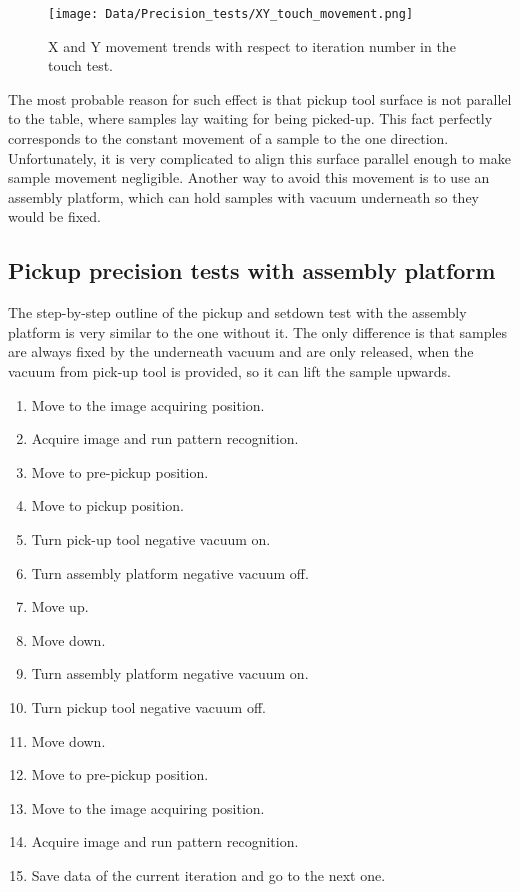 \begin{figure}[ht]\centering
\texttt{[image: Data/Precision\_tests/XY\_touch\_movement.png]}
\caption{X and Y movement trends with respect to iteration number in the touch test.}
\label{fig:touch_move}
\end{figure}

The most probable reason for such effect is that pickup tool surface is not parallel to the table, where samples lay waiting for being picked-up. This fact perfectly corresponds to the constant movement of a sample to the one direction. Unfortunately, it is very complicated to align this surface parallel enough to make sample movement negligible. Another way to avoid this movement is to use an assembly platform, which can hold samples with vacuum underneath so they would be fixed.

\subsection{Pickup precision tests with assembly platform}

The step-by-step outline of the pickup and setdown test with the assembly platform is very similar to the one without it. The only difference is that samples are always fixed by the underneath vacuum and are only released, when the vacuum from pick-up tool is provided, so it can lift the sample upwards.

\begin{enumerate}
\setlength\itemsep{-0.5em}
\item Move to the image acquiring position.
\item Acquire image and run pattern recognition.
\item Move to pre-pickup position.
\item Move to pickup position.
\item Turn pick-up tool negative vacuum on.
\item Turn assembly platform negative vacuum off.
\item Move up.
\item Move down.
\item Turn assembly platform negative vacuum on.
\item Turn pickup tool negative vacuum off.
\item Move down.
\item Move to pre-pickup position.
\item Move to the image acquiring position.
\item Acquire image and run pattern recognition.
\item Save data of the current iteration and go to the next one.
\end{enumerate}

